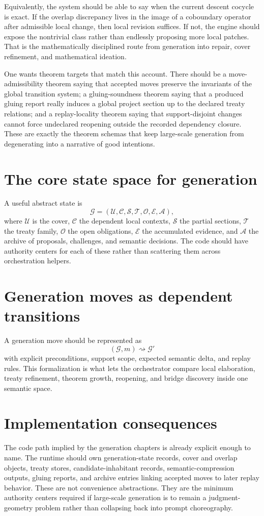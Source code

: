 \documentclass[11pt]{report}
\begin{document}
Equivalently, the system should be able to say when the current descent cocycle is exact. If the overlap discrepancy lives in the image of a coboundary operator after admissible local change, then local revision suffices. If not, the engine should expose the nontrivial class rather than endlessly proposing more local patches. That is the mathematically disciplined route from generation into repair, cover refinement, and mathematical ideation.

One wants theorem targets that match this account. There should be a move-admissibility theorem saying that accepted moves preserve the invariants of the global transition system; a gluing-soundness theorem saying that a produced gluing report really induces a global project section up to the declared treaty relations; and a replay-locality theorem saying that support-disjoint changes cannot force undeclared reopening outside the recorded dependency closure. These are exactly the theorem schemas that keep large-scale generation from degenerating into a narrative of good intentions.

\section{The core state space for generation}
A useful abstract state is
\[
\mathcal{G} = (\mathcal{U}, \mathcal{C}, \mathcal{S}, \mathcal{T}, \mathcal{O}, \mathcal{E}, \mathcal{A}),
\]
where $\mathcal{U}$ is the cover, $\mathcal{C}$ the dependent local contexts, $\mathcal{S}$ the partial sections, $\mathcal{T}$ the treaty family, $\mathcal{O}$ the open obligations, $\mathcal{E}$ the accumulated evidence, and $\mathcal{A}$ the archive of proposals, challenges, and semantic decisions. The code should have authority centers for each of these rather than scattering them across orchestration helpers.

\section{Generation moves as dependent transitions}
A generation move should be represented as
\[
(\mathcal{G}, m) \rightsquigarrow \mathcal{G}'
\]
with explicit preconditions, support scope, expected semantic delta, and replay rules. This formalization is what lets the orchestrator compare local elaboration, treaty refinement, theorem growth, reopening, and bridge discovery inside one semantic space.

\section{Implementation consequences}
The code path implied by the generation chapters is already explicit enough to name. The runtime should own generation-state records, cover and overlap objects, treaty stores, candidate-inhabitant records, semantic-compression outputs, gluing reports, and archive entries linking accepted moves to later replay behavior. These are not convenience abstractions. They are the minimum authority centers required if large-scale generation is to remain a judgment-geometry problem rather than collapsing back into prompt choreography.
\end{document}
